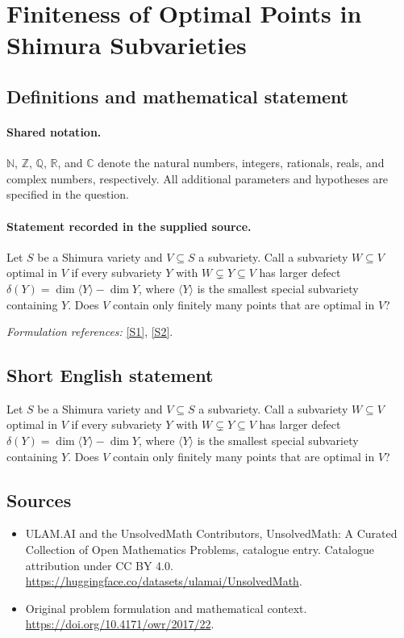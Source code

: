 \documentclass[11pt]{article}
\newcommand{\sref}[2]{\hyperlink{source:#1:#2}{[S#2]}}
\begin{document}
\section{Finiteness of Optimal Points in Shimura Subvarieties}\label{statement}

\subsection{Definitions and mathematical statement}

\paragraph{Shared notation.}$\mathbb N$, $\mathbb Z$, $\mathbb Q$, $\mathbb R$, and $\mathbb C$ denote the natural numbers, integers, rationals, reals, and complex numbers, respectively. All additional parameters and hypotheses are specified in the question.


\paragraph{Statement recorded in the supplied source.}
Let $S$ be a Shimura variety and $V\subseteq S$ a subvariety. Call a subvariety $W\subseteq V$ optimal in $V$ if every subvariety $Y$ with $W\subsetneq Y\subseteq V$ has larger defect $\delta(Y)=\dim\langle Y\rangle-\dim Y$, where $\langle Y\rangle$ is the smallest special subvariety containing $Y$. Does $V$ contain only finitely many points that are optimal in $V$?
\par\smallskip\textit{Formulation references:} \sref{statement}{1}, \sref{statement}{2}.
\subsection{Short English statement}
Let $S$ be a Shimura variety and $V\subseteq S$ a subvariety. Call a subvariety $W\subseteq V$ optimal in $V$ if every subvariety $Y$ with $W\subsetneq Y\subseteq V$ has larger defect $\delta(Y)=\dim\langle Y\rangle-\dim Y$, where $\langle Y\rangle$ is the smallest special subvariety containing $Y$. Does $V$ contain only finitely many points that are optimal in $V$?
\subsection{Sources}
\begin{itemize}
\item[\hypertarget{source:statement:1}{S1}] ULAM.AI and the UnsolvedMath Contributors, UnsolvedMath: A Curated Collection of Open Mathematics Problems, catalogue entry. Catalogue attribution under CC BY 4.0.
\url{https://huggingface.co/datasets/ulamai/UnsolvedMath}.
\item[\hypertarget{source:statement:2}{S2}] Original problem formulation and mathematical context.
\url{https://doi.org/10.4171/owr/2017/22}.
\end{itemize}
\label{end:statement}
\end{document}
